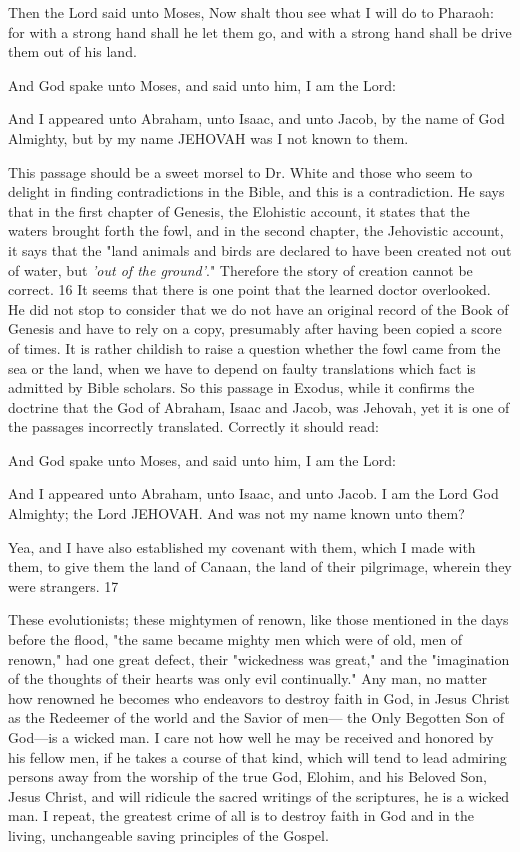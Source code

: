 Then the Lord said unto Moses, Now shalt thou see what I will do to Pharaoh: for with a
strong hand shall he let them go, and with a strong hand shall be drive them out of his land.

And God spake unto Moses, and said unto him, I am the Lord:

And I appeared unto Abraham, unto Isaac, and unto Jacob, by the name of God Almighty,
but by my name JEHOVAH was I not known to them.

This passage should be a sweet morsel to Dr. White and those who seem to delight in finding
contradictions in the Bible, and this is a contradiction. He says that in the first chapter of
Genesis, the Elohistic account, it states that the waters brought forth the fowl, and in the
second chapter, the Jehovistic account, it says that the "land animals and birds are declared to
have been created not out of water, but \textit{'out of the ground'}." Therefore the story of creation
cannot be correct. 16 It seems that there is one point that the learned doctor overlooked. He
did not stop to consider that we do not have an original record of the Book of Genesis and
have to rely on a copy, presumably after having been copied a score of times. It is rather
childish to raise a question whether the fowl came from the sea or the land, when we have to
depend on faulty translations which fact is admitted by Bible scholars. So this passage in
Exodus, while it confirms the doctrine that the God of Abraham, Isaac and Jacob, was
Jehovah, yet it is one of the passages incorrectly translated. Correctly it should read:

And God spake unto Moses, and said unto him, I am the Lord:

And I appeared unto Abraham, unto Isaac, and unto Jacob. I am the Lord God Almighty; the
Lord JEHOVAH. And was not my name known unto them?

Yea, and I have also established my covenant with them, which I made with them, to give
them the land of Canaan, the land of their pilgrimage, wherein they were strangers. 17

These evolutionists; these mightymen of renown, like those mentioned in the days before the
flood, "the same became mighty men which were of old, men of renown," had one great
defect, their "wickedness was great," and the "imagination of the thoughts of their hearts was
only evil continually." Any man, no matter how renowned he becomes who endeavors to
destroy faith in God, in Jesus Christ as the Redeemer of the world and the Savior of men—
the Only Begotten Son of God—is a wicked man. I care not how well he may be received
and honored by his fellow men, if he takes a course of that kind, which will tend to lead
admiring persons away from the worship of the true God, Elohim, and his Beloved Son,
Jesus Christ, and will ridicule the sacred writings of the scriptures, he is a wicked man. I
repeat, the greatest crime of all is to destroy faith in God and in the living, unchangeable
saving principles of the Gospel.

